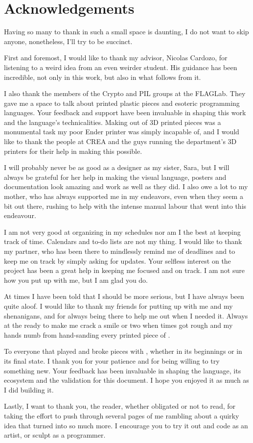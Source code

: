 
\chapter{Acknowledgements}

Having so many to thank in such a small space is daunting, I do not want to skip anyone, nonetheless, I'll try to be succinct.

First and foremost, I would like to thank my advisor, Nicolas Cardozo, for listening to a weird idea from an even weirder student.
His guidance has been incredible, not only in this work, but also in what follows from it.

I also thank the members of the Crypto and PIL groups at the FLAGLab. They gave me a space to talk about printed plastic pieces and
esoteric programming languages. Your feedback and support have been invaluable in shaping this work and the language's technicalities.
Making \sculpt out of 3D printed pieces was a monumental task my poor Ender printer was simply incapable of, and I would like to thank the people at CREA and the guys running the department's 3D printers for their help in making this possible.

I will probably never be as good as a designer as my sister, Sara, but I will always be grateful for
her help in making the \sculpt visual language, posters and documentation look amazing and work as well as they did.
I also owe a lot to my mother, who has always supported me in my endeavors, even when they seem a bit out there, rushing to help with the intense manual labour that went into this endeavour.

I am not very good at organizing in my schedules nor am I the best at keeping track of time. Calendars and to-do lists are not my thing.
I would like to thank my partner, who has been there to mindlessly remind me of deadlines and to keep me on track by simply asking for updates.
Your selfless interest on the project has been a great help in keeping me focused and on track.
I am not sure how you put up with me, but I am glad you do.

At times I have been told that I should be more serious, but I have always been quite aloof.
I would like to thank my friends for putting up with me and my shenanigans, and for always being there to help me out when I needed it.
Always at the ready to make me crack a smile or two when times got rough and my hands numb from hand-sanding every printed piece of \sculpt.

To everyone that played and broke pieces with \sculpt, whether in its beginnings or in its final state. I thank you for your patience and for being willing to try something new.
Your feedback has been invaluable in shaping the language, its ecosystem and the validation for this document.
I hope you enjoyed it as much as I did building it.

Lastly, I want to thank you, the reader, whether obligated or not to read, for taking the effort to push through several pages of me rambling about
a quirky idea that turned into so much more. I encourage you to try it out and code as an artist, or sculpt as a programmer.
\endinput

